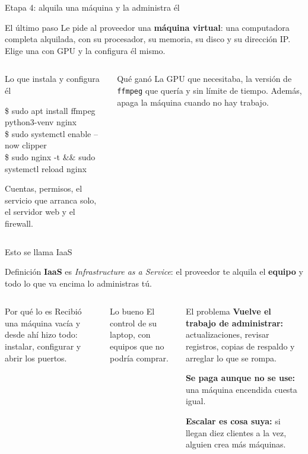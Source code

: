 \documentclass[aspectratio=169,10pt,c]{beamer}
\begin{document}
\begin{frame}{Etapa 4: alquila una máquina y la administra él}
\begin{block}{El último paso}
\small Le pide al proveedor una \textbf{máquina virtual}: una computadora completa alquilada, con su procesador, su memoria, su disco y su dirección IP. Elige una con GPU y la configura él mismo.
\end{block}
\begin{columns}[T,onlytextwidth]
\begin{exampleblock}{Lo que instala y configura él}
\begin{terminal}\footnotesize
\$ sudo apt install ffmpeg python3-venv nginx\\
\$ sudo systemctl enable --now clipper\\
\$ sudo nginx -t \&\& sudo systemctl reload nginx
\end{terminal}
\small Cuentas, permisos, el servicio que arranca solo, el servidor web y el firewall.
\end{exampleblock}
\begin{block}{Qué ganó}
\small La GPU que necesitaba, la versión de \texttt{ffmpeg} que quería y sin límite de tiempo. Además, apaga la máquina cuando no hay trabajo.
\end{block}
\end{columns}
\end{frame}

\begin{frame}{Esto se llama IaaS}
\begin{block}{Definición}
\small \textbf{IaaS} es \emph{Infrastructure as a Service}: el proveedor te alquila el \textbf{equipo} y todo lo que va encima lo administras tú.
\end{block}
\begin{columns}[T,onlytextwidth]
\begin{exampleblock}{Por qué lo es}
\small Recibió una máquina vacía y desde ahí hizo todo: instalar, configurar y abrir los puertos.
\end{exampleblock}
\begin{block}{Lo bueno}
\small El control de su laptop, con equipos que no podría comprar.
\end{block}
\begin{alertblock}{El problema}
\small
\textbf{Vuelve el trabajo de administrar:} actualizaciones, revisar registros, copias de respaldo y arreglar lo que se rompa.\par\smallskip
\textbf{Se paga aunque no se use:} una máquina encendida cuesta igual.\par\smallskip
\textbf{Escalar es cosa suya:} si llegan diez clientes a la vez, alguien crea más máquinas.
\end{alertblock}
\end{columns}
\end{frame}
\end{document}
